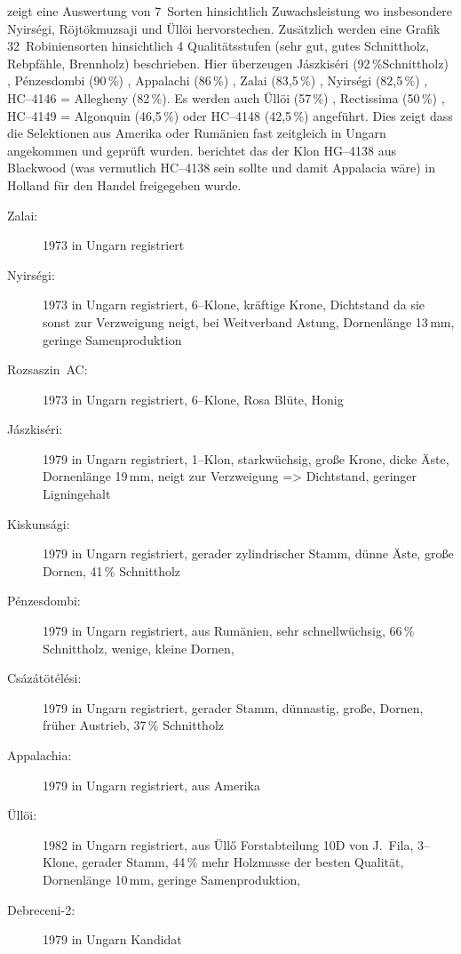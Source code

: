 \documentclass[twocolumn]{scrartcl}
\begin{document}
\citet{keresztesi1974robinie} zeigt eine Auswertung von 7~Sorten
hinsichtlich Zuwachsleistung wo insbesondere Nyirségi, Röjtökmuzsaji
und Üllöi hervorstechen. Zusätzlich werden eine Grafik 32~Robiniensorten
hinsichtlich 4 Qualitätsstufen (sehr gut, gutes Schnittholz,
Rebpfähle, Brennholz) beschrieben. Hier überzeugen
Jászkiséri (92\,\%Schnittholz)
, Pénzesdombi (90\,\%)
, Appalachi (86\,\%)
, Zalai (83,5\,\%)
, Nyirségi (82,5\,\%)
, HC--4146 = Allegheny (82\,\%). Es werden auch
Üllöi (57\,\%)
, Rectissima (50\,\%)
, HC--4149 = Algonquin (46,5\,\%)
oder HC--4148 (42,5\,\%)
angeführt. Dies zeigt dass die Selektionen aus Amerika oder Rumänien
fast zeitgleich in Ungarn angekommen und geprüft wurden.
\citet{bluemke1955robinie} berichtet das der Klon HG--4138 aus Blackwood (was
vermutlich HC--4138 sein sollte und damit Appalacia wäre) in Holland
für den Handel freigegeben wurde.

\begin{description}
  \item[Zalai:] 1973 in Ungarn registriert \citep{keresztesi1983robinie}
  \item[Nyirségi:] 1973 in Ungarn registriert, 6--Klone, kräftige Krone, Dichtstand da sie sonst zur Verzweigung neigt, bei Weitverband Astung, Dornenlänge 13\,mm, geringe Samenproduktion \citep{keresztesi1983robinie,kapusi1995robinie,abri2024dis}
  \item[Rozsaszin~AC:] 1973 in Ungarn registriert, 6--Klone, Rosa Blüte, Honig \citep{keresztesi1983robinie,kapusi1995robinie}
  \item[Jászkiséri:] 1979 in Ungarn registriert, 1--Klon, starkwüchsig, große Krone, dicke Äste, Dornenlänge 19\,mm, neigt zur Verzweigung => Dichtstand, geringer Ligningehalt \citep{keresztesi1983robinie,zsombor1980robinie,kapusi1995robinie,abri2024dis}
  \item[Kiskunsági:] 1979 in Ungarn registriert, gerader zylindrischer Stamm, dünne Äste, große Dornen, 41\,\% Schnittholz \citep{keresztesi1983robinie,zsombor1980robinie}
  \item[Pénzesdombi:] 1979 in Ungarn registriert, aus Rumänien, sehr schnellwüchsig, 66\,\% Schnittholz, wenige, kleine Dornen, \citet{zsombor1980robinie}
  \item[Csázátötélési:] 1979 in Ungarn registriert, gerader Stamm, dünnastig, große, Dornen, früher Austrieb, 37\,\% Schnittholz \citep{zsombor1980robinie}
  \item[Appalachia:] 1979 in Ungarn registriert, aus Amerika
  \item[Üllöi:] 1982 in Ungarn registriert, aus Üllő Forstabteilung 10D von J.~Fila, 3--Klone, gerader Stamm, 44\,\% mehr Holzmasse der besten Qualität, Dornenlänge 10\,mm, geringe Samenproduktion, \citep{bach1983robinie,kapusi1995robinie,abri2024dis,redei2020ulloi}
  \item[Debreceni-2:] 1979 in Ungarn Kandidat \citep{keresztesi1983robinie}
\end{description}
\end{document}
